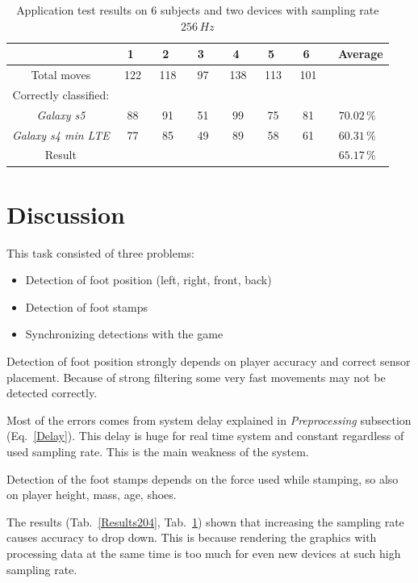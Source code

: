 \documentclass[conference]{IEEEtran}
\begin{document}
\begin{table}[h!]
	\caption{Application test results on 6 subjects and two devices with sampling rate $256\,Hz$}
	\begin{center}
		\begin{tabular}{c|cccccc|c}
			& \ 1 \ &\ 2 \ &\ 3 \ &\ 4 \ &\ 5 \ &\ 6 \ &\ Average\\
			\hline
			Total moves&122&118&97&138&113&101\\
			\hline
			Correctly classified:&&&&&&\\
			\emph{Galaxy s5}&88&91&51&99&75&81&$70.02\,\%$\\
			\emph{Galaxy s4 min LTE}&77&85&49&89&58&61&$60.31\,\%$\\
			\hline
		    Result&&&&&&&$65.17\,\%$
		\end{tabular}
		\label{Results256}
	\end{center}
\end{table}

\section{Discussion}

This task consisted of three problems:
\begin{itemize}
    \item Detection of foot position (left, right, front, back)
    \item Detection of foot stamps
    \item Synchronizing detections with the game
\end{itemize}

Detection of foot position strongly depends on player accuracy and correct sensor placement.
Because of strong filtering some very fast movements may not be detected correctly.

Most of the errors comes from system delay explained in \emph{Preprocessing} subsection (Eq.~\ref{Delay}).
This delay is huge for real time system and constant regardless of used sampling rate.
This is the main weakness of the system.

Detection of the foot stamps depends on the force used while stamping, so also on player height, mass, age, shoes.
 
The results (Tab.~\ref{Results204}, Tab.~\ref{Results256}) shown that increasing the sampling rate causes accuracy to drop down.
This is because rendering the graphics with processing data at the same time is too much for even new devices at such high sampling rate.
\end{document}
